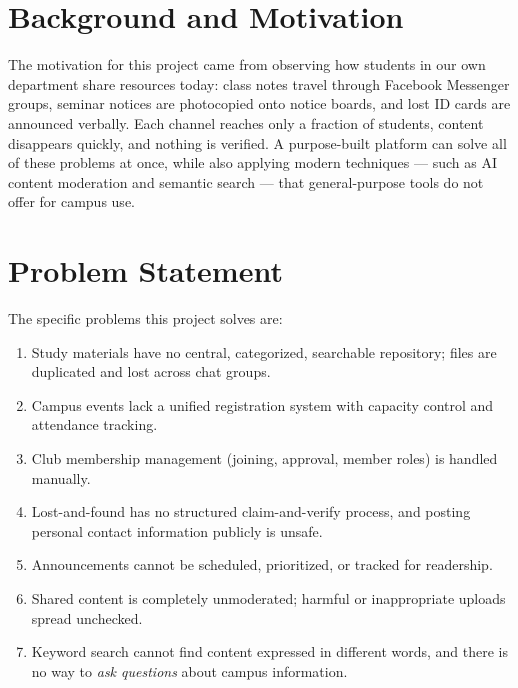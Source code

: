 \documentclass[12pt,a4paper]{report}
\begin{document}
\section{Background and Motivation}
The motivation for this project came from observing how students in
our own department share resources today: class notes travel through
Facebook Messenger groups, seminar notices are photocopied onto
notice boards, and lost ID cards are announced verbally. Each channel
reaches only a fraction of students, content disappears quickly, and
nothing is verified. A purpose-built platform can solve all of these
problems at once, while also applying modern techniques --- such as
AI content moderation and semantic search --- that general-purpose
tools do not offer for campus use.

\section{Problem Statement}
The specific problems this project solves are:
\begin{enumerate}[itemsep=2pt]
  \item Study materials have no central, categorized, searchable
        repository; files are duplicated and lost across chat groups.
  \item Campus events lack a unified registration system with
        capacity control and attendance tracking.
  \item Club membership management (joining, approval, member roles)
        is handled manually.
  \item Lost-and-found has no structured claim-and-verify process,
        and posting personal contact information publicly is unsafe.
  \item Announcements cannot be scheduled, prioritized, or tracked
        for readership.
  \item Shared content is completely unmoderated; harmful or
        inappropriate uploads spread unchecked.
  \item Keyword search cannot find content expressed in different
        words, and there is no way to \emph{ask questions} about
        campus information.
\end{enumerate}
\end{document}
